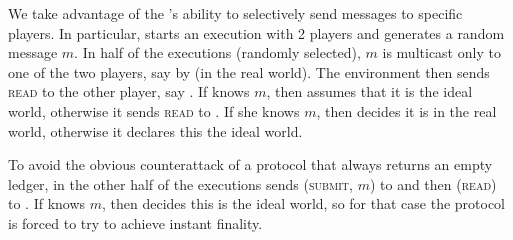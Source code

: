   \begin{proofsketch}
    We take advantage of the \adversary's ability to selectively send messages
    to specific players. In particular, \environment{} starts an execution with
    2 players and generates a random message $m$. In half of the executions
    (randomly selected), $m$ is multicast only to one of the two players, say
    \alice{} by \adversary{} (in the real world). The environment then sends
    \textsc{read} to the other player, say \bob. If \bob{} knows $m$, then
    \environment{} assumes that it is the ideal world, otherwise it sends
    \textsc{read} to \alice. If she knows $m$, then \environment{} decides it is
    in the real world, otherwise it declares this the ideal world.

    To avoid the obvious counterattack of a protocol that always returns an
    empty ledger, in the other half of the executions \environment{} sends
    (\textsc{submit}, $m$) to \alice{} and then (\textsc{read}) to \bob. If
    \bob{} knows $m$, then \environment{} decides this is the ideal world, so
    for that case the protocol is forced to try to achieve instant finality.
  \end{proofsketch}

